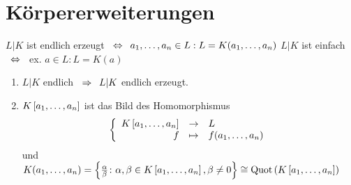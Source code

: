 \section{Körpererweiterungen}

\begin{definition}
    $L | K$ ist endlich erzeugt $\enskip \Leftrightarrow \enskip a_1, \dots , a_n \in L : L=K(a_1, \dots, a_n)$
    $L | K$ ist einfach $\enskip \Leftrightarrow \enskip$ ex. $a \in L: L=K(a)$
\end{definition}

\begin{bemerkung}
    \begin{enumerate}[leftmargin=*, label=(\alph*)]
        \item $L | K$ endlich $\enskip \Rightarrow \enskip L | K$ endlich erzeugt.
        \item $\polynom[K][a_1, \dots, a_n]$ ist das Bild des Homomorphismus
        \begin{align*}
            \bigabbnoname{\polynom[K][a_1, \dots, a_n]}{L}{f}{f(a_1, \dots, a_n)}
        \end{align*}
        und $K(a_1, \dots , a_n) = \menge{\frac{\alpha}{\beta} \colon \alpha, \beta \in \polynom[K][a_1, \dots, a_n], \beta \neq 0} \isomorph \Quot\left( \polynom[K][a_1, \dots, a_n] \right)$
    \end{enumerate}
\end{bemerkung}

